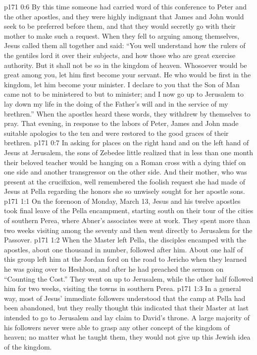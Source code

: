 \vs p171 0:6 By this time someone had carried word of this conference to Peter and the other apostles, and they were highly indignant that James and John would seek to be preferred before them, and that they would secretly go with their mother to make such a request. When they fell to arguing among themselves, Jesus called them all together and said: \textcolor{ubdarkred}{“You well understand how the rulers of the gentiles lord it over their subjects, and how those who are great exercise authority. But it shall not be so in the kingdom of heaven. Whosoever would be great among you, let him first become your servant. He who would be first in the kingdom, let him become your minister. I declare to you that the Son of Man came not to be ministered to but to minister; and I now go up to Jerusalem to lay down my life in the doing of the Father’s will and in the service of my brethren.”} When the apostles heard these words, they withdrew by themselves to pray. That evening, in response to the labors of Peter, James and John made suitable apologies to the ten and were restored to the good graces of their brethren.\plusone
\vs p171 0:7 In asking for places on the right hand and on the left hand of Jesus at Jerusalem, the sons of Zebedee little realized that in less than one month their beloved teacher would be hanging on a Roman cross with a dying thief on one side and another transgressor on the other side. And their mother, who was present at the crucifixion, well remembered the foolish request she had made of Jesus at Pella regarding the honors she so unwisely sought for her apostle sons.
\vs p171 1:1 On the forenoon of Monday, March 13, Jesus and his twelve apostles took final leave of the Pella encampment, starting south on their tour of the cities of southern Perea, where Abner’s associates were at work. They spent more than two weeks visiting among the seventy and then went directly to Jerusalem for the Passover.
\vs p171 1:2 When the Master left Pella, the disciples encamped with the apostles, about one thousand in number, followed after him. About one half of this group left him at the Jordan ford on the road to Jericho when they learned he was going over to Heshbon, and after he had preached the sermon on “Counting the Cost.” They went on up to Jerusalem, while the other half followed him for two weeks, visiting the towns in southern Perea.
\vs p171 1:3 In a general way, most of Jesus’ immediate followers understood that the camp at Pella had been abandoned, but they really thought this indicated that their Master at last intended to go to Jerusalem and lay claim to David’s throne. A large majority of his followers never were able to grasp any other concept of the kingdom of heaven; no matter what he taught them, they would not give up this Jewish idea of the kingdom.
